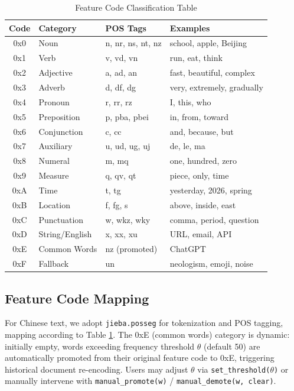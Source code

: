 \documentclass[11pt,a4paper]{article}
\theoremstyle{definition}
\begin{document}
\begin{table}[H]
\centering
\caption{Feature Code Classification Table}
\label{tab:feat}
\begin{tabular}{clll}
\toprule
\textbf{Code} & \textbf{Category} & \textbf{POS Tags} & \textbf{Examples} \\
\midrule
0x0 & Noun & n, nr, ns, nt, nz & school, apple, Beijing \\
0x1 & Verb & v, vd, vn & run, eat, think \\
0x2 & Adjective & a, ad, an & fast, beautiful, complex \\
0x3 & Adverb & d, df, dg & very, extremely, gradually \\
0x4 & Pronoun & r, rr, rz & I, this, who \\
0x5 & Preposition & p, pba, pbei & in, from, toward \\
0x6 & Conjunction & c, cc & and, because, but \\
0x7 & Auxiliary & u, ud, ug, uj & de, le, ma \\
0x8 & Numeral & m, mq & one, hundred, zero \\
0x9 & Measure & q, qv, qt & piece, only, time \\
0xA & Time & t, tg & yesterday, 2026, spring \\
0xB & Location & f, fg, s & above, inside, east \\
0xC & Punctuation & w, wkz, wky & comma, period, question \\
0xD & String/English & x, xx, xu & URL, email, API \\
0xE & Common Words & nz (promoted) & ChatGPT \\
0xF & Fallback & un & neologism, emoji, noise \\
\bottomrule
\end{tabular}
\end{table}

\subsection{Feature Code Mapping}

For Chinese text, we adopt \texttt{jieba.posseg} for tokenization and POS tagging, mapping according to Table \ref{tab:feat}. The 0xE (common words) category is dynamic: initially empty, words exceeding frequency threshold $\theta$ (default 50) are automatically promoted from their original feature code to 0xE, triggering historical document re-encoding. Users may adjust $\theta$ via \texttt{set\_threshold($\theta$)} or manually intervene with \texttt{manual\_promote(w)} / \texttt{manual\_demote(w, clear)}.
\end{document}
